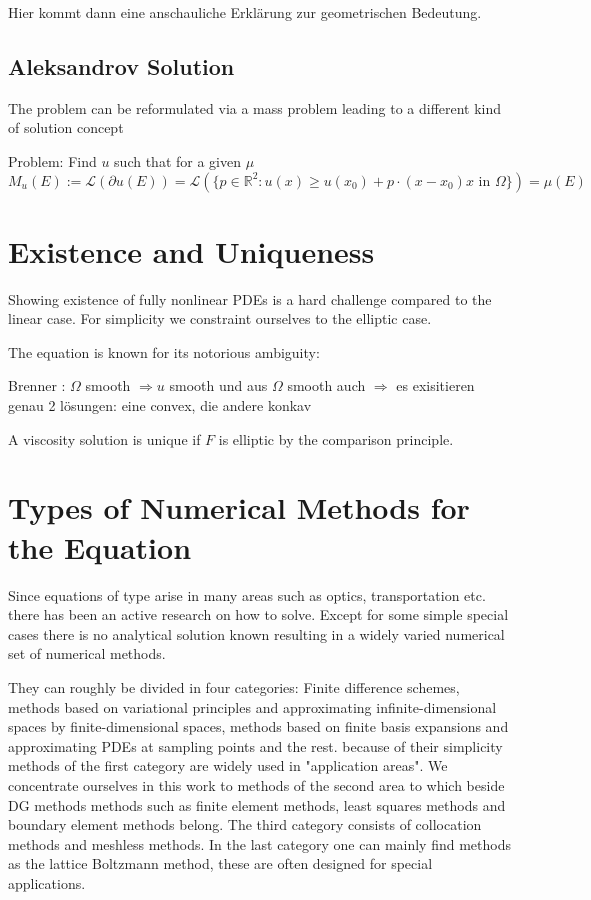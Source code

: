 Hier kommt dann eine anschauliche Erklärung zur geometrischen Bedeutung.

\subsection{Aleksandrov Solution}
The \MA problem can be reformulated via a mass problem leading to a different kind of solution concept

\begin{definition}
Problem: Find $u$ such that for a given $\mu$
\[
M_u(E):=\mathcal{L}(\partial u(E))=\mathcal{L}(\{p \in \mathbb{R}^2 : u(x) \geq u(x_0)+p\cdot(x-x_0) x \text{ in } \Omega \}) = \mu(E)
\]
\end{definition}


\section{Existence and Uniqueness}
Showing existence of fully nonlinear PDEs is a hard challenge compared to the linear case. For simplicity we constraint ourselves to the elliptic case. 

The \MA equation is known for its notorious ambiguity:
\begin{example}
\end{example}

Brenner\cite{Brenner2012} : $\Omega$ smooth $\Rightarrow u$ smooth \cite{Caffarelli1984} und aus $\Omega$ smooth auch $\Rightarrow$ es exisitieren genau 2 lösungen: eine convex, die andere konkav \cite{Courant1989}

A viscosity solution is unique if $F$ is elliptic by the comparison principle.


\section{Types of Numerical Methods for the \MA Equation}
Since equations of \MA type arise in many areas such as optics, transportation etc. there has been an active research on how to solve. Except for some simple special cases there is no analytical solution known resulting in a widely varied numerical set of numerical methods.

They can roughly be divided in four categories: Finite difference schemes, methods based on variational principles and approximating infinite-dimensional spaces by finite-dimensional spaces, methods based on finite basis expansions and approximating PDEs at sampling points and the rest.
because of their simplicity methods of the first category are widely used in "application areas". We concentrate ourselves in this work to methods of the second area to which beside DG methods methods such as finite element methods, least squares methods and boundary element methods belong.
The third category consists of collocation methods and meshless methods.
In the last category one can mainly find methods as the lattice Boltzmann method, these are often designed for special applications.

